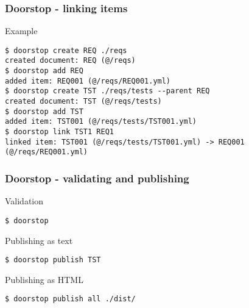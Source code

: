 \documentclass[aspectratio=169]{beamer}
\begin{document}
\begin{frame}[fragile]
  \frametitle{Doorstop - linking items}
  \begin{block}{Example}
   \begin{verbatim}
$ doorstop create REQ ./reqs
created document: REQ (@/reqs)
$ doorstop add REQ
added item: REQ001 (@/reqs/REQ001.yml)
$ doorstop create TST ./reqs/tests --parent REQ
created document: TST (@/reqs/tests)
$ doorstop add TST
added item: TST001 (@/reqs/tests/TST001.yml)
$ doorstop link TST1 REQ1
linked item: TST001 (@/reqs/tests/TST001.yml) -> REQ001 (@/reqs/REQ001.yml)
   \end{verbatim}
   \end{block}
\end{frame}

\begin{frame}[fragile]
  \frametitle{Doorstop - validating and publishing}
 \begin{block}{Validation}
   \begin{verbatim}
$ doorstop
   \end{verbatim}
   \end{block}
 \begin{block}{Publishing as text}
   \begin{verbatim}
$ doorstop publish TST
   \end{verbatim}
   \end{block}
 \begin{block}{Publishing as HTML}
   \begin{verbatim}
$ doorstop publish all ./dist/
   \end{verbatim}
   \end{block}
\end{frame}
\end{document}
